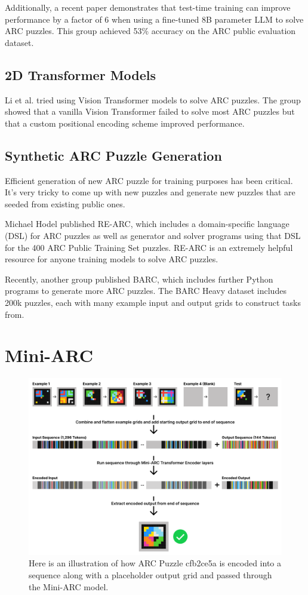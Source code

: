 \documentclass[10pt,twocolumn]{article}
\begin{document}
Additionally, a recent paper\cite{ttt} demonstrates that test-time
training can improve performance by a factor of 6 when using a
fine-tuned 8B parameter LLM to solve ARC puzzles. This group achieved
53\% accuracy on the ARC public evaluation dataset.

\subsection{2D Transformer Models}
Li et al.\cite{li2024tacklingabstractionreasoningcorpus} tried
using Vision Transformer models to solve ARC puzzles. The group
showed that a vanilla Vision Transformer failed to solve most ARC
puzzles but that a custom positional encoding scheme improved performance.

\subsection{Synthetic ARC Puzzle Generation}
Efficient generation of new ARC puzzle for training purposes has been
critical. It's very tricky to come up with new puzzles and generate
new puzzles that are seeded from existing public ones.

Michael Hodel published RE-ARC\cite{rearc}, which includes a
domain-specific language (DSL) for ARC puzzles as well as generator
and solver programs using that DSL for the 400 ARC Public Training Set puzzles.
RE-ARC is an extremely helpful resource for anyone training models to
solve ARC puzzles.

Recently, another group published BARC\cite{barc}, which includes
further Python programs to generate more ARC puzzles. The BARC Heavy
dataset \cite{barcheavy} includes 200k puzzles, each with many example
input and output grids to construct tasks from.

\section{Mini-ARC}

\begin{figure}[ht!]
  \centering
  \includegraphics[width=\textwidth]{figures/sequence.png}
  \caption{Here is an illustration of how ARC Puzzle cfb2ce5a is
    encoded into a sequence along with a placeholder output grid and
  passed through the Mini-ARC model.}
  \label{fig:sequence-fig}
\end{figure}
\end{document}
